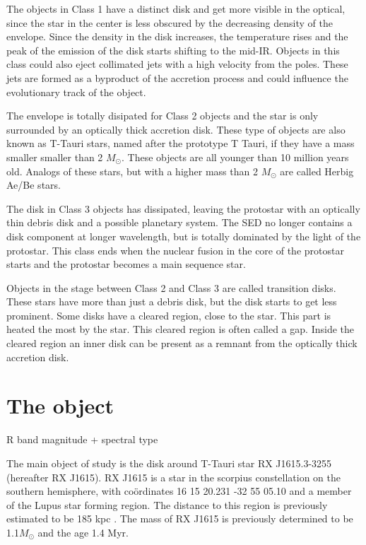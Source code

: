\documentclass[twoside,single]{lion-msc}
\begin{document}
The objects in Class 1 have a distinct disk and get more visible in the optical, since the star in the center is less obscured by the decreasing density of the envelope. Since the density in the disk increases, the temperature rises and the peak of the emission of the disk starts shifting to the mid-IR. Objects in this class could also eject collimated jets with a high velocity from the poles. These jets are formed as a byproduct of the accretion process and could influence the evolutionary track of the object.
\bigskip

The envelope is totally disipated for Class 2 objects and the star is only surrounded by an optically thick accretion disk. These type of objects are also known as T-Tauri stars, named after the prototype T Tauri, if they have a mass smaller smaller than 2 $M_\odot$. These objects are all younger than 10 million years old. Analogs of these stars, but with a higher mass than 2 $M_\odot$ are called Herbig Ae/Be stars. 
\bigskip

The disk in Class 3 objects has dissipated, leaving the protostar with an optically thin debris disk and a possible planetary system. The SED no longer contains a disk component at longer wavelength, but is totally dominated by the light of the protostar. This class ends when the nuclear fusion in the core of the protostar starts and the protostar becomes a main sequence star.
\bigskip

Objects in the stage between Class 2 and Class 3 are called transition disks. These stars  have more than just a debris disk, but the disk starts to get less prominent. Some disks have a cleared region, close to the star. This part is heated the most by the star. This cleared region is often called a gap. Inside the cleared region an inner disk can be present as a remnant from the optically thick accretion disk.

\section{The object}
R band magnitude + spectral type

The main object of study is the disk around T-Tauri star RX J1615.3-3255 (hereafter RX J1615). RX J1615 is a star in the scorpius constellation on the southern hemisphere, with co\"ordinates 16 15 20.231 -32 55 05.10 and a member of the Lupus star forming region. The distance to this region is previously estimated to be 185 kpc \cite{Krautter1997}. The mass of RX J1615 is previously determined to be 1.1$M_\odot$ and the age 1.4 Myr\cite{Wahhaj2010}. 
\end{document}
